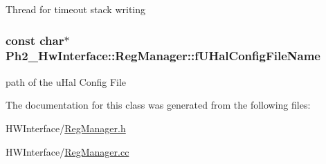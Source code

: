 Thread for timeout stack writing \hypertarget{class_ph2___hw_interface_1_1_reg_manager_aaaa29ca65c283acc645132c7bef0f24f}{
\subsubsection[{f\-U\-Hal\-Config\-File\-Name}]{\setlength{\rightskip}{0pt plus 5cm}const char$\ast$ Ph2\-\_\-\-Hw\-Interface\-::\-Reg\-Manager\-::f\-U\-Hal\-Config\-File\-Name\hspace{0.3cm}{\ttfamily [protected]}}}\label{class_ph2___hw_interface_1_1_reg_manager_aaaa29ca65c283acc645132c7bef0f24f}
path of the u\-Hal Config File 

The documentation for this class was generated from the following files\-:\begin{DoxyCompactItemize}
\item 
H\-W\-Interface/\hyperlink{_reg_manager_8h}{Reg\-Manager.\-h}\item 
H\-W\-Interface/\hyperlink{_reg_manager_8cc}{Reg\-Manager.\-cc}\end{DoxyCompactItemize}
